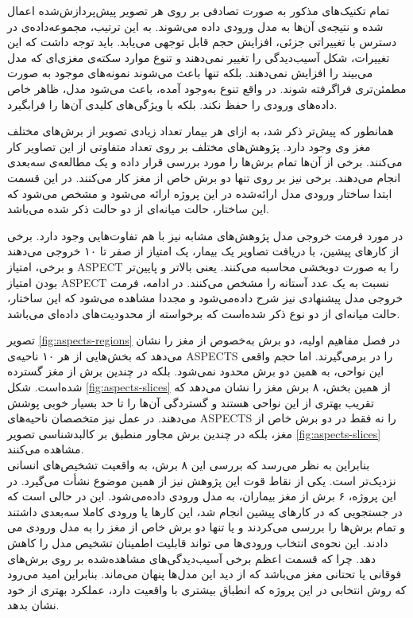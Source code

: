 تمام تکنیک‌های مذکور به صورت تصادفی بر روی هر تصویر پیش‌پردازش‌شده اعمال شده و نتیجه‌ی آن‌ها
به مدل ورودی داده می‌شوند.
به این ترتیب، مجموعه‌داده‌ی در دسترس با تغییراتی جزئی، افزایش حجم قابل توجهی می‌یابد.
باید توجه داشت که این تغییرات، شکل آسیب‌دیدگی را تغییر نمی‌دهند و تنوع موارد سکته‌ی مغزی‌ای که مدل می‌بیند را 
افزایش نمی‌دهند.
بلکه تنها باعث می‌شوند نمونه‌های موجود به صورت مطمئن‌تری فراگرفته شوند.
در واقع تنوع به‌وجود آمده، باعث می‌شود مدل، ظاهر خاص داده‌های ورودی را حفظ نکند. بلکه با ویژگی‌های کلیدی آن‌ها را فرابگیرد.


همانطور که پیش‌تر ذکر شد، به ازای هر بیمار تعداد زیادی تصویر از برش‌های مختلف مغز وی وجود دارد.
پژوهش‌ها‌ی مختلف بر روی تعداد متفاوتی از این تصاویر کار می‌کنند.
برخی از آن‌ها تمام برش‌ها را مورد بررسی قرار داده و یک مطالعه‌ی سه‌بعدی انجام می‌دهند.
برخی نیز بر روی تنها دو برش خاص از مغز کار می‌کنند.
در این قسمت ابتدا ساختار ورودی مدل ارائه‌شده در این پروژه ارائه می‌شود
و مشخص می‌شود که
این ساختار، حالت میانه‌ای از دو حالت ذکر شده می‌باشد.

در مورد فرمت خروجی مدل پژوهش‌های مشابه نیز با هم تفاوت‌هایی وجود دارد.
برخی از کارهای پیشین، با دریافت تصاویر یک بیمار، یک امتیاز از صفر تا ۱۰ خروجی می‌دهند و برخی، امتیاز ASPECT را به صورت دوبخشی محاسبه می‌کنند.
یعنی بالاتر و پایین‌تر بودن امتیاز ASPECT نسبت به یک عدد آستانه را مشخص می‌کنند.
در ادامه، فرمت خروجی مدل پیشنهادی نیز شرح داده‌می‌شود و
مجددا مشاهده می‌شود که این ساختار، حالت میانه‌ای از دو نوع ذکر شده‌است که برخواسته از محدودیت‌های داده‌ای می‌باشد.


تصویر \ref{fig:aspects-regions}
در فصل مفاهیم اولیه، دو برش به‌خصوص از مغز را نشان می‌دهد که بخش‌هایی از هر ۱۰ ناحیه‌ی ASPECTS را در برمی‌گیرند.
اما حجم واقعی این نواحی، به همین دو برش محدود نمی‌شود.
بلکه در چندین برش از مغز گسترده شده‌است.
شکل \ref{fig:aspects-slices}
از همین بخش، ۸ برش مغز را نشان می‌دهد که تقریب بهتری از این نواحی هستند و گستردگی آن‌ها را تا حد بسیار خوبی پوشش می‌دهند.
در عمل نیز متخصصان
ناحیه‌های ASPECTS را 
 نه فقط در دو برش خاص از مغز، بلکه 
 در چندین برش مجاور منطبق بر کالبدشناسی تصویر 
 \ref{fig:aspects-slices}
 مشاهده می‌کنند.\\

 بنابراین به نظر می‌رسد که بررسی این ۸ برش، به واقعیت تشخیص‌های انسانی نزدیک‌تر است.
 یکی از نقاط قوت این پژوهش نیز از همین موضوع نشأت می‌گیرد.
 در این پروژه، ۶ برش از مغز بیماران، به مدل ورودی داده‌می‌شود.
این در حالی است که در جستجویی که در کارهای پیشین
انجام شد، این کارها یا ورودی کاملا سه‌بعدی داشتند و تمام برش‌ها را بررسی می‌کردند و یا تنها دو برش خاص از مغز را به مدل ورودی می دادند.
این نحوه‌ی انتخاب ورودی‌ها می تواند قابلیت اطمینان تشخیص مدل را کاهش دهد.
چرا که قسمت اعظم برخی آسیب‌دیدگی‌های مشاهده‌شده
بر روی برش‌های فوقانی یا تحتانی مغز می‌باشد که از دید این مدل‌ها پنهان می‌ماند.
بنابراین امید می‌رود که روش انتخابی در این پروژه که انطباق بیشتری با واقعیت دارد، عملکرد بهتری از خود نشان بدهد.\\

